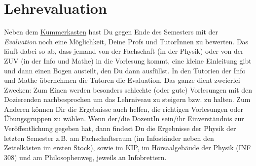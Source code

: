 \section{Lehrevaluation}
\label{eval}

\noindent Neben dem \hyperref[kummerkasten]{Kummerkasten} hast Du gegen Ende des Semesters mit der \emph{Evaluation} noch eine Möglichkeit, Deine Profs und TutorInnen zu bewerten. Das läuft dabei so ab, dass jemand von der Fachschaft (in der Physik) oder von der ZUV (in der Info und Mathe) in die Vorlesung kommt, eine kleine Einleitung gibt und dann einen Bogen austeilt, den Du dann ausfüllst. In den Tutorien der Info und Mathe übernehmen die Tutoren die Evaluation. Das ganze dient zweierlei Zwecken: Zum Einen werden besonders schlechte (oder gute) Vorlesungen mit den Dozierenden nachbesprochen um das Lehrniveau zu steigern bzw. zu halten. Zum Anderen können Dir die Ergebnisse auch helfen, die richtigen Vorlesungen oder Übungsgruppen zu wählen. Wenn der/die DozentIn sein/ihr Einverständnis zur Veröffentlichung gegeben hat, dann findest Du die Ergebnisse der Physik der letzten Semester z.B. am Fachschaftsraum (im Infoständer neben den Zettelkästen im ersten Stock), sowie im \gls{KIP}, im Hörsaalgebäude der Physik (\Gls{INF} 308) und am Philosophenweg, jeweils an Infobrettern.

